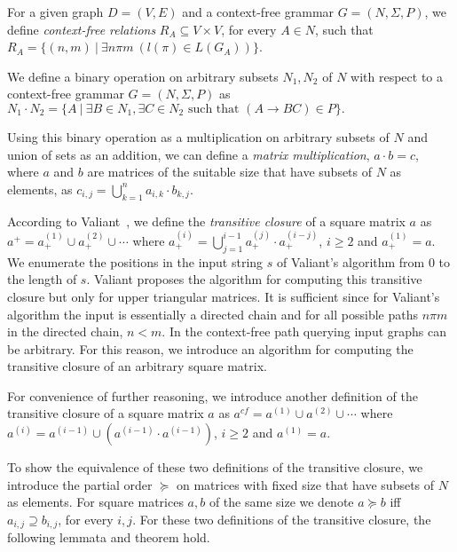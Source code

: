 For a given graph $D = (V, E)$ and a context-free grammar $G = (N, \Sigma, P)$, we define \textit{context-free relations} $R_A \subseteq V \times V$, for every $A \in N$, such that $R_A = \{(n,m)~|~\exists n \pi m~(l(\pi) \in L(G_A))\}$.

We define a binary operation on arbitrary subsets $N_1 , N_2$ of $N$ with respect to a context-free grammar $G = (N, \Sigma, P)$ as $N_1 \cdot N_2 = \{A~|~\exists B \in N_1, \exists C \in N_2 \text{ such that }(A \rightarrow B C) \in P\}.$

Using this binary operation as a multiplication on arbitrary subsets of $N$ and union of sets as an addition, we can define a \textit{matrix multiplication}, $a \cdot b = c$, where $a$ and $b$ are matrices of the suitable size that have subsets of $N$ as elements, as $c_{i,j} = \bigcup^{n}_{k=1}{a_{i,k} \cdot b_{k,j}}$.

According to Valiant~\cite{valiant}, we define the \textit{transitive closure} of a square matrix $a$ as $a^+ = a^{(1)}_+ \cup a^{(2)}_+ \cup \cdots$ where $a^{(i)}_+ = \bigcup^{i-1}_{j=1}{a^{(j)}_+ \cdot a^{(i-j)}_+}$, $i \ge 2$ and $a^{(1)}_+ = a$. We enumerate the positions in the input string $s$ of Valiant's algorithm from 0 to the length of $s$. Valiant proposes the algorithm for computing this transitive closure but only for upper triangular matrices. It is sufficient since for Valiant's algorithm the input is essentially a directed chain and for all possible paths $n \pi m$ in the directed chain, $n < m$. In the context-free path querying input graphs can be arbitrary. For this reason, we introduce an algorithm for computing the transitive closure of an arbitrary square matrix.

For convenience of further reasoning, we introduce another definition of the transitive closure of a square matrix $a$ as $a^{cf} = a^{(1)} \cup a^{(2)} \cup \cdots$ where $a^{(i)} = a^{(i-1)} \cup (a^{(i-1)} \cdot a^{(i-1)})$, $i \ge 2$ and $a^{(1)} = a$.

To show the equivalence of these two definitions of the transitive closure, we introduce the partial order $\succeq$ on matrices with fixed size that have subsets of $N$ as elements. For square matrices $a, b$ of the same size we denote $a \succeq b$ iff $a_{i,j} \supseteq b_{i,j}$, for every $i, j$. For these two definitions of the transitive closure, the following lemmata and theorem hold.

